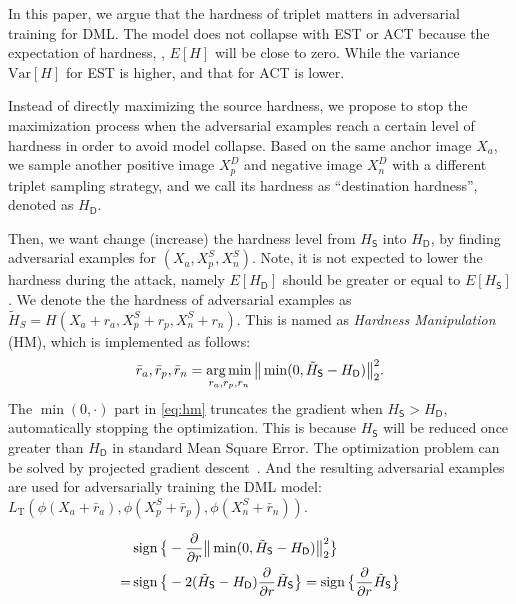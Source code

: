 \documentclass[10pt,twocolumn,letterpaper]{article}
\begin{document}
In this paper, we argue that the hardness of triplet matters in adversarial
training for DML.
%
The model does not collapse with EST or ACT because the expectation of hardness,
\ie, $E[H]$ will be close to zero.
%
While the variance $\text{Var}[H]$ for EST is higher, and that for ACT is lower.

Instead of directly maximizing the source hardness, we propose to stop the
maximization process when the adversarial examples reach a certain level of
hardness in order to avoid model collapse.
%
Based on the same anchor image $X_a$, we sample another positive image $X_p^D$
and negative image $X_n^D$ with a different triplet sampling strategy, and
we call its hardness as ``destination hardness'', denoted as $H_\mathsf{D}$.

Then, we want change (increase) the hardness level from $H_\mathsf{S}$ into $H_\mathsf{D}$, by
finding adversarial examples for $(X_a, X_p^S, X_n^S)$.
%
Note, it is not expected to lower the hardness during the attack, namely
$E[H_\mathsf{D}]$ should be greater or equal to $E[H_\mathsf{S}]$.
%
We denote the the hardness of adversarial examples as $\tilde{H}_S=H(X_a{+}r_a,
X_p^S{+}r_p, X_n^S{+}r_n)$.
%
This is named as \emph{Hardness Manipulation} (HM), which is implemented as
follows:
%
\begin{equation}
	\bar{r}_a, \bar{r}_p, \bar{r}_n = \operatorname*{arg\,min}_{r_a,r_p,r_n} \big\|\min(0,
	\tilde{H}_\mathsf{S} - H_\mathsf{D}) \big\|_2^2.
	\label{eq:hm}
\end{equation}
%
The $\min(0,\cdot)$ part in \cref{eq:hm} truncates the gradient when $H_\mathsf{S}>H_\mathsf{D}$,
automatically stopping the optimization.
%
This is because $H_\mathsf{S}$ will be reduced once greater than $H_\mathsf{D}$ in standard Mean
Square Error.
%
The optimization problem can be solved by projected gradient
descent~\cite{madry}.
%
And the resulting adversarial examples are used for adversarially training the
DML model:
%
$L_\text{T}(\phi(X_a+\bar{r}_a), \phi(X_p^S+\bar{r}_p),
\phi(X_n^S+\bar{r}_n))$.

\begin{align}
	&
	\operatorname{sign}\big\{
		-\frac{\partial}{\partial r} \big\| \min(0, 
		\tilde{H}_\mathsf{S} - H_\mathsf{D}) \big\|_2^2
	\big\}
	\\
	=&
	\operatorname{sign}\big\{
		-2(\tilde{H}_\mathsf{S}-H_\mathsf{D})
		\frac{\partial }{\partial r} \tilde{H}_\mathsf{S} \big\}
	=
	\operatorname{sign}\big\{
		\frac{\partial}{\partial r} \tilde{H}_\mathsf{S}
		\big\}
\end{align}
\end{document}
